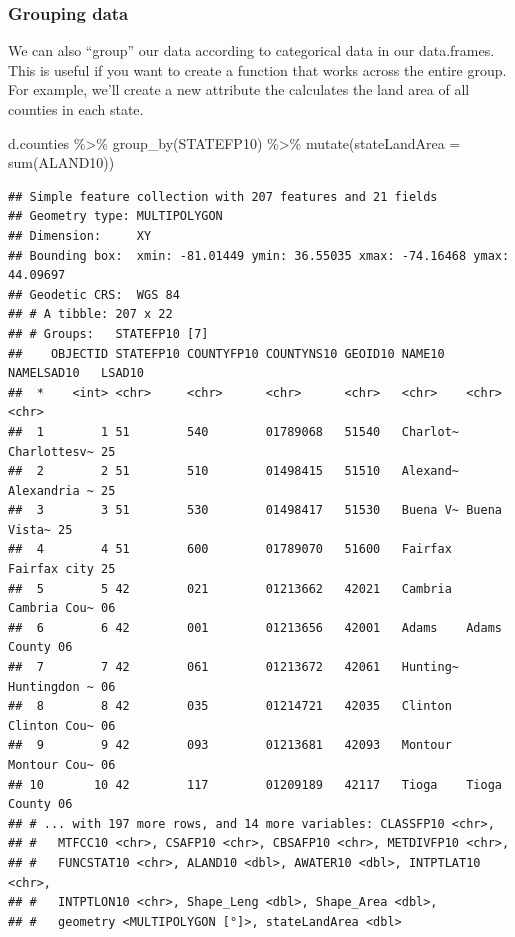 \documentclass[]{article}
\newenvironment{Shaded}{\begin{snugshade}}{\end{snugshade}}
\newcommand{\AttributeTok}[1]{\textcolor[rgb]{0.77,0.63,0.00}{#1}}
\newcommand{\FunctionTok}[1]{\textcolor[rgb]{0.00,0.00,0.00}{#1}}
\newcommand{\NormalTok}[1]{#1}
\newcommand{\SpecialCharTok}[1]{\textcolor[rgb]{0.00,0.00,0.00}{#1}}
\begin{document}
\hypertarget{grouping-data}{%
\subsubsection{Grouping data}\label{grouping-data}}

We can also ``group'' our data according to categorical data in our
data.frames. This is useful if you want to create a function that works
across the entire group. For example, we'll create a new attribute the
calculates the land area of all counties in each state.

\begin{Shaded}
\begin{Highlighting}[]
\NormalTok{d.counties }\SpecialCharTok{\%\textgreater{}\%} \FunctionTok{group\_by}\NormalTok{(STATEFP10) }\SpecialCharTok{\%\textgreater{}\%} \FunctionTok{mutate}\NormalTok{(}\AttributeTok{stateLandArea =} \FunctionTok{sum}\NormalTok{(ALAND10))}
\end{Highlighting}
\end{Shaded}

\begin{verbatim}
## Simple feature collection with 207 features and 21 fields
## Geometry type: MULTIPOLYGON
## Dimension:     XY
## Bounding box:  xmin: -81.01449 ymin: 36.55035 xmax: -74.16468 ymax: 44.09697
## Geodetic CRS:  WGS 84
## # A tibble: 207 x 22
## # Groups:   STATEFP10 [7]
##    OBJECTID STATEFP10 COUNTYFP10 COUNTYNS10 GEOID10 NAME10   NAMELSAD10   LSAD10
##  *    <int> <chr>     <chr>      <chr>      <chr>   <chr>    <chr>        <chr> 
##  1        1 51        540        01789068   51540   Charlot~ Charlottesv~ 25    
##  2        2 51        510        01498415   51510   Alexand~ Alexandria ~ 25    
##  3        3 51        530        01498417   51530   Buena V~ Buena Vista~ 25    
##  4        4 51        600        01789070   51600   Fairfax  Fairfax city 25    
##  5        5 42        021        01213662   42021   Cambria  Cambria Cou~ 06    
##  6        6 42        001        01213656   42001   Adams    Adams County 06    
##  7        7 42        061        01213672   42061   Hunting~ Huntingdon ~ 06    
##  8        8 42        035        01214721   42035   Clinton  Clinton Cou~ 06    
##  9        9 42        093        01213681   42093   Montour  Montour Cou~ 06    
## 10       10 42        117        01209189   42117   Tioga    Tioga County 06    
## # ... with 197 more rows, and 14 more variables: CLASSFP10 <chr>,
## #   MTFCC10 <chr>, CSAFP10 <chr>, CBSAFP10 <chr>, METDIVFP10 <chr>,
## #   FUNCSTAT10 <chr>, ALAND10 <dbl>, AWATER10 <dbl>, INTPTLAT10 <chr>,
## #   INTPTLON10 <chr>, Shape_Leng <dbl>, Shape_Area <dbl>,
## #   geometry <MULTIPOLYGON [°]>, stateLandArea <dbl>
\end{verbatim}
\end{document}
